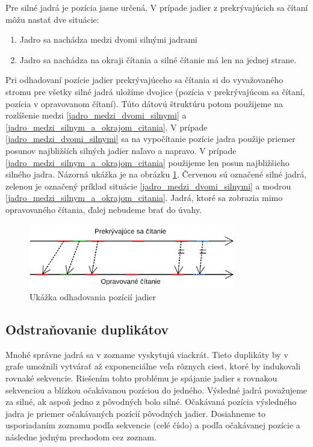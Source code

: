 Pre silné jadrá je pozícia jasne určená. V prípade jadier z prekrývajúcich sa čítaní môžu nastať dve situácie:

\begin{enumerate}[label={S.\arabic*}]
\item \label{jadro_medzi_dvomi_silnymi} Jadro sa nachádza medzi dvomi silnými jadrami
\item \label{jadro_medzi_silnym_a_okrajom_citania} Jadro sa nachádza na okraji čítania a silné čítanie má len na jednej strane.
\end{enumerate}

Pri odhadovaní pozície jadier prekrývajúceho sa čítania si do vyvažovaného stromu pre všetky silné jadrá uložíme dvojice (pozícia v prekrývajúcom sa čítaní, pozícia v opravovanom čítaní). Túto dátovú štruktúru potom použijeme na rozlíšenie medzi \ref{jadro_medzi_dvomi_silnymi} a \ref{jadro_medzi_silnym_a_okrajom_citania}. V prípade \ref{jadro_medzi_dvomi_silnymi} sa na vypočítanie pozície jadra použije priemer posunov najbližších silných jadier naľavo a napravo. V prípade \ref{jadro_medzi_silnym_a_okrajom_citania} použijeme len posun najbližšieho silného jadra. Názorná ukážka je na obrázku \ref{fig:odhadovanie_pozicie}. Červenou sú označené silné jadrá, zelenou je označený príklad situácie \ref{jadro_medzi_dvomi_silnymi} a modrou \ref{jadro_medzi_silnym_a_okrajom_citania}. Jadrá, ktoré sa zobrazia mimo opravovaného čítania, ďalej nebudeme brať do úvahy.

\begin{figure}
    \centering
    \includegraphics[width=0.8\textwidth]{images/odhadovanie_pozicie.png}
    \caption{Ukážka odhadovania pozícií jadier}
    \label{fig:odhadovanie_pozicie}
\end{figure} 

\subsection{Odstraňovanie duplikátov}

Mnohé správne jadrá sa v zozname vyskytujú viackrát. Tieto duplikáty by v grafe umožnili vytvárať až exponenciálne veľa rôznych ciest, ktoré by indukovali rovnaké sekvencie. Riešením tohto problému je spájanie jadier s rovnakou sekvenciou a blízkou očakávanou pozíciou do jedného. Výsledné jadrá považujeme za silné, ak aspoň jedno z pôvodných bolo silné. Očakávaná pozícia výsledného jadra je priemer očakávaných pozícií pôvodných jadier. Dosiahneme to usporiadaním zoznamu podľa sekvencie (celé číslo) a podľa očakávanej pozície a následne jedným prechodom cez zoznam. 

